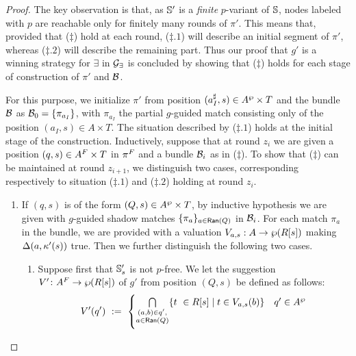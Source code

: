 \begin{proof}
The key observation is that, as $\mathbb{S}'$ is a \emph{finite} $p$-variant of $\mathbb{S}$, nodes labeled with $p$ are reachable only for finitely many rounds of $\pi'$. This means that, provided that ($\ddag$) hold at each round, ($\ddag.1$) will describe an initial segment of $\pi'$, whereas ($\ddag.2$) will describe the remaining part. Thus our proof that $g'$ is a winning strategy for $\exists$ in $\mathcal{G}_{\exists}$ is concluded by showing that ($\ddag$) holds for each stage of construction of $\pi'$ and $\mathcal{B}$.

\medskip

For this purpose, we initialize $\pi'$ from position $(a_{I}^{\sharp},s) \in A^{\wp}\times T$ and the bundle $\mathcal{B}$ as $\mathcal{B}_0 = \{\pi_{a_I}\}$, with $\pi_{a_I}$ the partial $g$-guided match consisting only of the position $(a_I,s)\in A\times T$. The situation described by ($\ddag .1$) holds at the initial stage of the construction.
Inductively, suppose that at round $z_i$ we are given a position $(q,s) \in A^{F} \times T$ in $\pi^{F}$ and a bundle $\mathcal{B}_i$ as in ($\ddag$). To show that ($\ddag$) can be maintained at round $z_{i+1}$, we distinguish two cases, corresponding respectively to situation ($\ddag.1$) and ($\ddag.2$) holding at round $z_i$.
\begin{enumerate}[label = (\Alph*), ref = \Alph*]
  \item If $(q,s)$ is of the form $(Q,s) \in A^{\wp} \times T$, by inductive hypothesis we are given with $g$-guided shadow matches $\{\pi_a\}_{a \in \mathsf{Ran}(Q)}$ in $\mathcal{B}_i$. For each match $\pi_a$ in the bundle, we are provided with a valuation $V_{a,s}: A \rightarrow \wp (R[s])$ making $\Delta(a,\kappa'(s))$ true. Then we further distinguish the following two cases.
\begin{enumerate}[label = (\roman*), ref = \roman*]
  \item \label{point:TsNotPFree} Suppose first that $\mathbb{S}'_s$ is not $p$-free. We let the suggestion $V' \colon A^{F} \to \wp (R[s])$ of $g'$ from position $(Q,s)$ be defined as follows:
       \begin{align*}
       V'(q')\ :=\ \begin{cases}
               \bigcap\limits_{\substack{(a,b) \in q',\\ a \in \mathsf{Ran}(Q)}}\{t\ \in R[s] \mid t \in V_{a,s}(b)\}               & q' \in A^{\wp} \\[2em]

\end{cases}
\end{align*}
\end{enumerate}
\end{enumerate}
\end{proof}
